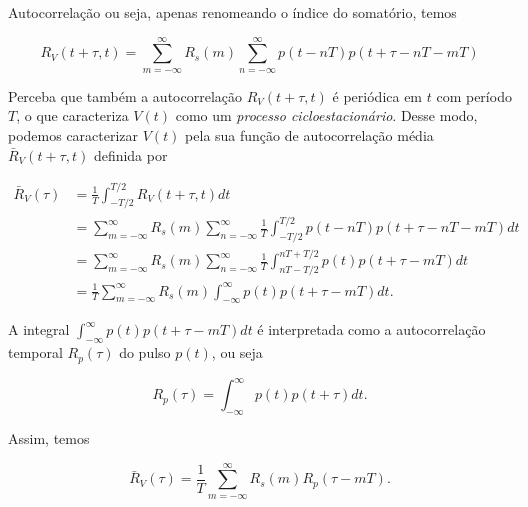 \documentclass[
  ignorenonframetext,
]{beamer}
\begin{document}
\begin{frame}{Autocorrelação}
ou seja, apenas renomeando o índice do somatório, temos

\begin{equation}
R_{V}(t+\tau, t) =\sum_{m=-\infty}^{\infty} R_{s}(m) \sum_{n=-\infty}^{\infty} p(t-nT) p(t+\tau -nT -mT)
\end{equation}

Perceba que também a autocorrelação \(R_{V}(t+\tau, t)\) é periódica em
\(t\) com período \(T\), o que caracteriza \(V(t)\) como um
\emph{processo cicloestacionário}. Desse modo, podemos caracterizar
\(V(t)\) pela sua função de autocorrelação média
\(\bar{R}_{V}(t+\tau, t)\) definida por

\begin{equation}
\begin{aligned}
\bar{R}_{V}(\tau) &=\frac{1}{T} \int_{-T / 2}^{T / 2} R_{V}(t+\tau, t) d t \\
&=\sum_{m=-\infty}^{\infty} R_{s}(m) \sum_{n=-\infty}^{\infty} \frac{1}{T} \int_{-T / 2}^{T / 2} p(t-n T) p(t+\tau-n T-m T) d t \\
&=\sum_{m=-\infty}^{\infty} R_{s}(m) \sum_{n=-\infty}^{\infty} \frac{1}{T} \int_{n T-T / 2}^{n T+T / 2} p(t) p(t+\tau-m T) d t \\
&=\frac{1}{T} \sum_{m=-\infty}^{\infty} R_{s}(m) \int_{-\infty}^{\infty} p(t) p(t+\tau-m T) d t.
\end{aligned}
\end{equation}

A integral \(\int_{-\infty}^{\infty} p(t) p(t+\tau-m T) dt\) é
interpretada como a autocorrelação temporal \(R_{p}(\tau)\) do pulso
\(p(t)\), ou seja

\begin{equation}
R_{p}(\tau)=\int_{-\infty}^{\infty} p(t) p(t+\tau) dt.
\end{equation}

Assim, temos

\begin{equation}
\bar{R}_{V}(\tau)=\frac{1}{T} \sum_{m=-\infty}^{\infty} R_{s}(m) R_{p}(\tau-m T).
\end{equation}
\end{frame}
\end{document}
